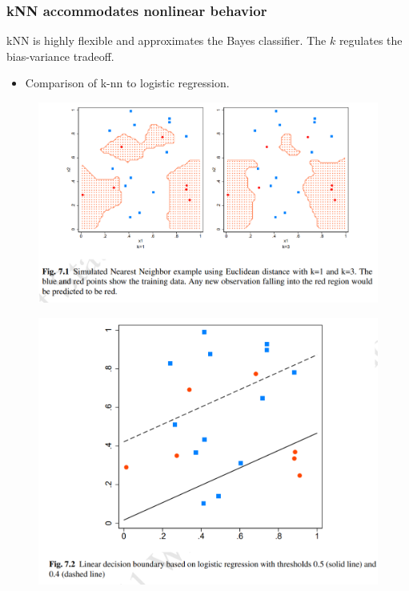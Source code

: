 \documentclass[12pt, oneside]{article}
\begin{document}
\subsubsection{kNN accommodates nonlinear behavior}
kNN is highly flexible and approximates the Bayes classifier. The $k$ regulates the bias-variance tradeoff. 
\begin{itemize}
    \item Comparison of k-nn to logistic regression.
\end{itemize}
    \begin{figure}[ht]
    \centering
    \includegraphics[width=\textwidth]{knn-1-3.png}       
    \label{fig:my_label}
    \end{figure}
    \begin{figure}[ht]
    \centering
    \includegraphics[width=\textwidth]{log-reg.png}       
    \label{fig:my_label}
    \end{figure}
\newpage
\end{document}
